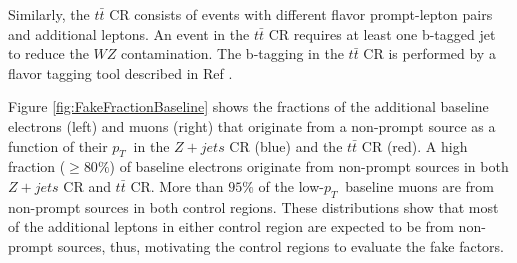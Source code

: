Similarly, the $t\bar{t}$ CR consists of events with different flavor prompt-lepton pairs and additional leptons. An event in the $t\bar{t}$ CR requires at least one b-tagged jet to reduce the $WZ$ contamination. The b-tagging in the $t\bar{t}$ CR is performed by a flavor tagging tool described in Ref \cite{btagATLAS}.

Figure \ref{fig:FakeFractionBaseline} shows the fractions of the additional baseline electrons (left) and muons (right) that originate from a non-prompt source as a function of their $p_{T}~$ in the $Z+jets$ CR (blue) and the $t\bar{t}$ CR (red). A high fraction ($\geq 80\%$) of baseline electrons originate from non-prompt sources in both $Z+jets$ CR and $t\bar{t}$ CR. More than $95\%$ of the low-$p_{T}~$ baseline muons are from non-prompt sources in both control regions. These distributions show that most of the additional leptons in either control region are expected to be from non-prompt sources, thus,  motivating the control regions to evaluate the fake factors.

